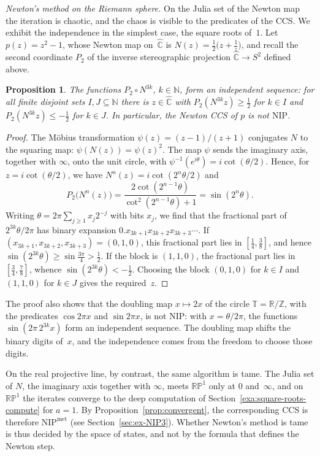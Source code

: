 \documentclass[psamsfonts]{amsart}
\newtheorem{prop}[thm]{Proposition}
\theoremstyle{definition}
\theoremstyle{remark}
\newcommand{\hatC}{\hat{\mathbb{C}}}
\newcommand{\NIP}{\text{NIP}}
\newcommand{\RP}{\mathbb{R}\mathbb{P}}
\numberwithin{equation}{section}
\begin{document}
\emph{Newton's method on the Riemann sphere.}
On the Julia set of the Newton map the iteration is chaotic, and the chaos is visible to the
predicates of the CCS.
We exhibit the independence in the simplest case, the square roots of~$1$.
Let $p(z)=z^2-1$, whose Newton map on~$\hatC$ is $N(z)=\frac12\bigl(z+\frac1z\bigr)$, and recall the second coordinate $P_2$ of the inverse stereographic projection $\hatC\to S^2$ defined above.

\begin{prop}\label{prop:Newton-wild}
The functions $P_2\circ N^{3k}$, $k\in\mathbb{N}$, form an independent sequence:
for all finite disjoint sets $I,J\subseteq\mathbb{N}$ there is $z\in\hatC$ with
$P_2(N^{3k}z)\ge\frac12$ for $k\in I$ and $P_2(N^{3k}z)\le-\frac12$ for $k\in J$.
In particular, the Newton CCS of $p$ is not $\NIP$.
\end{prop}

\begin{proof}
The Möbius transformation $\psi(z)=(z-1)/(z+1)$ conjugates $N$ to the squaring
map: $\psi(N(z))=\psi(z)^2$.
The map $\psi$ sends the imaginary axis, together with $\infty$, onto the unit circle, with
$\psi^{-1}(e^{i\theta})=i\cot(\theta/2)$.
Hence, for $z=i\cot(\theta/2)$, we have $N^n(z)=i\cot(2^{n}\theta/2)$ and
\[
P_2\bigl(N^n(z)\bigr)=\frac{2\cot(2^{n-1}\theta)}{\cot^2(2^{n-1}\theta)+1}=\sin(2^n\theta).
\]
Writing $\theta=2\pi\sum_{j\ge1}x_j2^{-j}$ with bits $x_j$, we find that the fractional part of $2^{3k}\theta/2\pi$ has binary expansion
$0.x_{3k+1}x_{3k+2}x_{3k+3}\cdots$.
If $(x_{3k+1},x_{3k+2},x_{3k+3})=(0,1,0)$, this fractional part lies in
$[\frac14,\frac38]$, and hence $\sin(2^{3k}\theta)\ge\sin\frac{3\pi}{4}>\frac12$.
If the block is $(1,1,0)$, the fractional part lies in $[\frac34,\frac78]$, whence $\sin(2^{3k}\theta)<-\frac12$.
Choosing the block $(0,1,0)$ for $k\in I$ and $(1,1,0)$ for $k\in J$ gives the
required~$z$.
\end{proof}

The proof also shows that the doubling map $x\mapsto2x$ of the circle
$\mathbb{T}=\mathbb{R}/\mathbb{Z}$, with the predicates $\cos2\pi x$ and
$\sin2\pi x$, is not $\NIP$: with $x=\theta/2\pi$, the functions
$\sin(2\pi\,2^{3k}x)$ form an independent sequence.
The doubling map shifts the binary digits of~$x$, and the independence comes
from the freedom to choose those digits.

On the real projective line, by contrast, the same algorithm is tame.
The Julia set of $N$, the imaginary axis together with $\infty$, meets
$\RP^1$ only at $0$ and~$\infty$, and on $\RP^1$ the iterates converge to the deep
computation of Section~\ref{exa:square-roots-compute} for $a=1$.
By Proposition~\ref{prop:convergent}, the corresponding CCS is therefore $\NIP^{\mathrm{met}}$ (see Section~\ref{sec:ex-NIP3}).
Whether Newton's method is tame is thus decided by the space of states, and not by the
formula that defines the Newton step.
\end{document}

